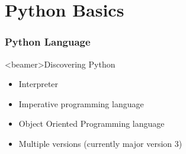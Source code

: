 
\part{Python Basics}  %


\section{Python Language}

\begin{frame}<beamer>{Discovering Python}

  \begin{itemize}
    \item<1-> Interpreter~\\
    \item<3-> Imperative programming language
    \item<4-> Object Oriented Programming language
    \item<5-> Multiple versions (currently major version 3)~\\
  \end{itemize}

\end{frame}



